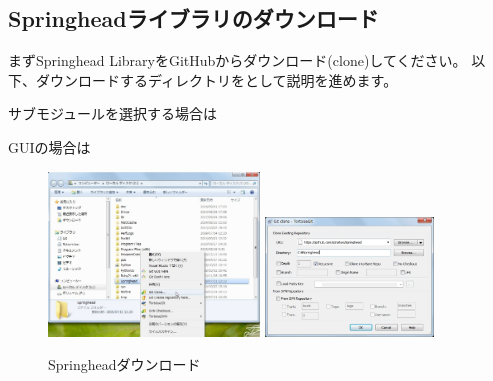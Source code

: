 \subsection{Springheadライブラリのダウンロード}
\label{subsec:Download}

\noindent
まずSpringhead LibraryをGitHubからダウンロード(clone)してください。
以下、ダウンロードするディレクトリを\SprTop{}として説明を進めます。

\medskip
\begin{narrow}[15pt]
\end{narrow}
\medskip
サブモジュールを選択する場合は
\begin{narrow}[15pt]
\end{narrow}
\medskip
GUIの場合は
\begin{narrow}[15pt]
	\begin{figure}[h]
	\begin{center}
	\includegraphics[width=0.5\textwidth]{fig/SpringheadClone1.eps}
	\includegraphics[width=0.4\textwidth]{fig/SpringheadClone2.eps}
	\end{center}
	\caption{Springheadダウンロード}
	\label{fig:SpringheadClone}
	\end{figure}
\end{narrow}

